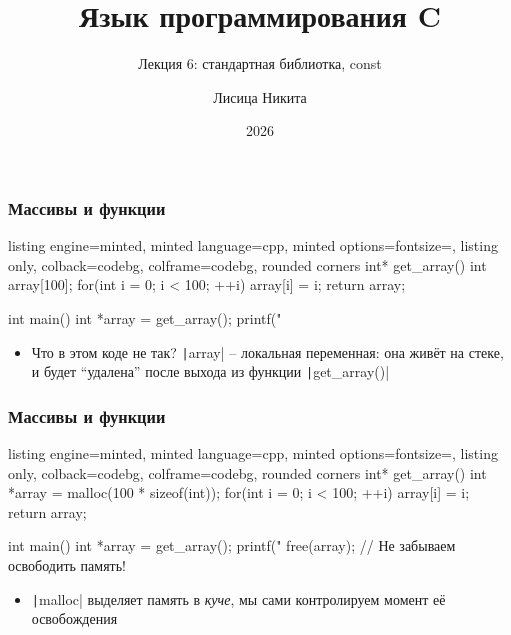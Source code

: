 \documentclass[10pt]{beamer}
\title{Язык программирования C}
\subtitle{Лекция 6: стандартная библиотка, const}
\author{Лисица Никита}
\date{2026}
\begin{document}
\frame{\titlepage}

\begin{frame}[fragile]
\frametitle{Массивы и функции}
\begin{tcblisting}{listing engine=minted, minted language=cpp, minted options={fontsize=\scriptsize}, listing only, colback=codebg, colframe=codebg, rounded corners}
int* get_array() {
  int array[100];
  for(int i = 0; i < 100; ++i) {
    array[i] = i;
  }
  return array;
}

int main() {
  int *array = get_array();
  printf("%
}
\end{tcblisting}
\begin{itemize}
\item Что в этом коде не так? \pause \texttt|array| -- локальная переменная: она живёт на стеке, и будет ``удалена'' после выхода из функции \texttt|get_array()|
\end{itemize}
\end{frame}

\begin{frame}[fragile]
\frametitle{Массивы и функции}
\begin{tcblisting}{listing engine=minted, minted language=cpp, minted options={fontsize=\scriptsize}, listing only, colback=codebg, colframe=codebg, rounded corners}
int* get_array() {
  int *array = malloc(100 * sizeof(int));
  for(int i = 0; i < 100; ++i) {
    array[i] = i;
  }
  return array;
}

int main() {
  int *array = get_array();
  printf("%
  free(array); // Не забываем освободить память!
}
\end{tcblisting}
\pause
{}
\begin{itemize}
\item \texttt|malloc| выделяет память в \textit{куче}, мы сами контролируем момент её освобождения
\end{itemize}
\end{frame}
\end{document}
